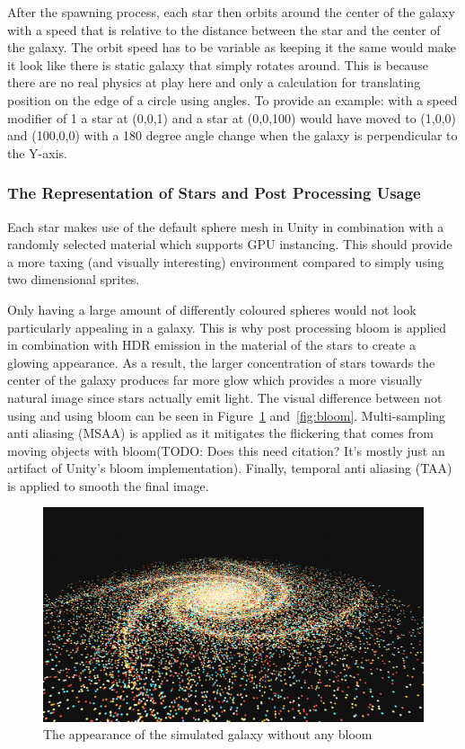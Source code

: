 After the spawning process, each star then orbits around the center of the galaxy with a speed that is relative to the distance between the star and the center of the galaxy. The orbit speed has to be variable as keeping it the same would make it look like there is static galaxy that simply rotates around. This is because there are no real physics at play here and only a calculation for translating position on the edge of a circle using angles. To provide an example: with a speed modifier of 1 a star at (0,0,1) and a star at (0,0,100) would have moved to (1,0,0) and (100,0,0) with a 180 degree angle change when the galaxy is perpendicular to the Y-axis. 

\subsubsection{The Representation of Stars and Post Processing Usage}
Each star makes use of the default sphere mesh in Unity in combination with a randomly selected material which supports GPU instancing. This should provide a more taxing (and visually interesting) environment compared to simply using two dimensional sprites. 

Only having a large amount of differently coloured spheres would not look particularly appealing in a galaxy. This is why post processing bloom is applied in combination with HDR emission in the material of the stars to create a glowing appearance. As a result, the larger concentration of stars towards the center of the galaxy produces far more glow which provides a more visually natural image since stars actually emit light. The visual difference between not using and using bloom can be seen in Figure~\ref{fig:nobloom} and~\ref{fig:bloom}.
Multi-sampling anti aliasing (MSAA) is applied as it mitigates the flickering that comes from moving objects with bloom(TODO: Does this need citation? It's mostly just an artifact of Unity's bloom implementation). Finally, temporal anti aliasing (TAA) is applied to smooth the final image. 

\begin{figure}[tbph]
    \centering
    \includegraphics[width=1\textwidth]{Figures/noBloom.png}
    \caption[Galaxy without bloom]{The appearance of the simulated galaxy without any bloom}
    \label{fig:nobloom}
\end{figure}


